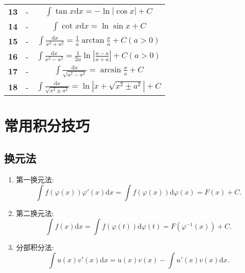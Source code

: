\documentclass{article}
\begin{document}
\begin{center}
\begin{longtable}{c|cc}
		\textbf{13} & - & $\displaystyle \int \tan x\mathrm{d}x=-\ln|\cos x|+C$\\
		\textbf{14} & - & $\displaystyle \int \cot x\mathrm{d}x=\ln\sin x+C$\\
		\textbf{15} & - & $\displaystyle \int \frac{\mathrm{d}x}{x^2+a^2}=\frac{1}{a}\arctan\frac{x}{a}+C(a>0)$\\
		\textbf{16} & - & $\displaystyle \int \frac{\mathrm{d}x}{x^2-a^2}=\frac{1}{2a}\ln\left|\frac{x-a}{x+a}\right|+C(a>0)$\\
		\textbf{17} & - & $\displaystyle \int\frac{\mathrm{d}x}{\sqrt{a^2-x^2}}=\arcsin\frac{x}{a}+C$\\
		\textbf{18} & - & $\displaystyle \int\frac{\mathrm{d}x}{\sqrt{x^2\pm a^2}}=\ln\left|x+\sqrt{x^2\pm a^2}\right|+C$\\
		
		\bottomrule
	\end{longtable}
\end{center}
	
\section{常用积分技巧}
\subsection{换元法}
\begin{enumerate}
	\renewcommand{\labelenumi}{\textbf{\theenumi. }}
	\item 第一换元法:
		\[\int f(\varphi(x))\varphi'(x)\mathrm{d}x=\int f(\varphi(x))\mathrm{d}\varphi(x)=F(x)+C.\]
	\item 第二换元法:
		\[\int f(x)\mathrm{d}x=\int f(\varphi(t))\mathrm{d}\varphi(t)=F(\varphi^{-1}(x))+C.\]
	\item 分部积分法:
		\[\int u(x)v'(x)\mathrm{d}x=u(x)v(x)-\int u'(x)v(x)\mathrm{d}x.\]
\end{enumerate}
\end{document}
